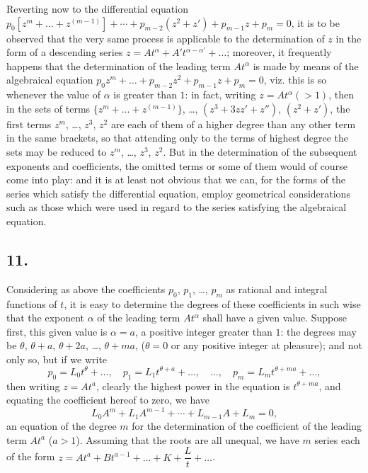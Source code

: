 \documentclass[11pt,a4paper]{book}
\begin{document}
Reverting now to the differential equation $p_0[z^m + \ldots + z^{(m-1)}] + \cdots + p_{m-2}(z^2 + z') + p_{m-1}z + p_m = 0$, it is to be observed that the very same process is applicable to the determination of $z$ in the form of a descending series $z = At^\alpha + A' t^{\alpha - \alpha'} + \ldots$; moreover, it frequently happens that the determination of the leading term $At^\alpha$ is made by means of the algebraical equation $p_0 z^m + \ldots + p_{m-2}z^2 + p_{m-1}z + p_m = 0$, viz. this is so whenever the value of $\alpha$ is greater than $1$: in fact, writing $z = At^\alpha(> 1)$, then in the sets of terms $\{z^m + \ldots + z^{(m-1)}\}$, \ldots, $(z^3 + 3zz' + z'')$, $(z^2 + z')$, the first terms $z^m$, \ldots, $z^3$, $z^2$ are each of them of a higher degree than any other term in the same brackets, so that attending only to the terms of highest degree the sets may be reduced to $z^m$, \ldots, $z^3$, $z^2$. But in the determination of the subsequent exponents and coefficients, the omitted terms or some of them would of course come into play: and it is at least not obvious that we can, for the forms of the series which satisfy the differential equation, employ geometrical considerations such as those which were used in regard to the series satisfying the algebraical equation.

\subsection*{11.}

Considering as above the coefficients $p_0$, $p_1$, \ldots, $p_m$ as rational and integral functions of $t$, it is easy to determine the degrees of these coefficients in such wise that the exponent $\alpha$ of the leading term $At^\alpha$ shall have a given value. Suppose first, this given value is $\alpha = a$, a positive integer greater than $1$: the degrees may be $\theta$, $\theta + a$, $\theta + 2a$, \ldots, $\theta + ma$, ($\theta = 0$ or any positive integer at pleasure); and not only so, but if we write
\[
p_0 = L_0 t^\theta + \ldots, \quad p_1 = L_1 t^{\theta + a} + \ldots, \quad \ldots, \quad p_m = L_m t^{\theta + ma} + \ldots,
\]
then writing $z = At^a$, clearly the highest power in the equation is $t^{\theta + ma}$, and equating the coefficient hereof to zero, we have
\[
L_0 A^m + L_1 A^{m-1} + \cdots + L_{m-1}A + L_m = 0,
\]
an equation of the degree $m$ for the determination of the coefficient of the leading term $At^a$ ($a > 1$). Assuming that the roots are all unequal, we have $m$ series each of the form $z = At^a + Bt^{a-1} + \ldots + K + \dfrac{L}{t} + \ldots$.
\end{document}
